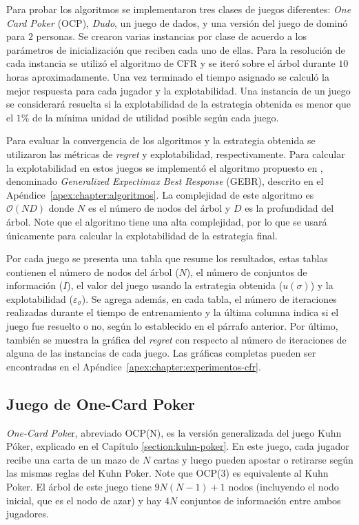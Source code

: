 Para probar los algoritmos se implementaron tres clases de juegos diferentes: \textit{One Card Poker} (OCP), \textit{Dudo}, un juego de dados, y una versión del juego de dominó para $2$ personas. Se crearon varias instancias por clase de acuerdo a los parámetros de inicialización que reciben cada uno de ellas. Para la resolución de cada instancia se utilizó el algoritmo de CFR y se iteró sobre el árbol durante $10$ horas aproximadamente. Una vez terminado el tiempo asignado se calculó la mejor respuesta para cada jugador y la explotabilidad. Una instancia de un juego se considerará resuelta si la explotabilidad de la estrategia obtenida es menor que el $1\%$ de la mínima unidad de utilidad posible según cada juego.

Para evaluar la convergencia de los algoritmos y la estrategia obtenida se utilizaron las métricas de \textit{regret} y explotabilidad, respectivamente. Para calcular la explotabilidad en estos juegos se implementó el algoritmo propuesto en \cite{bib:thesis-marc-lanctot}, denominado \textit{Generalized Expectimax Best Response} (GEBR), descrito en el Apéndice~\ref{apex:chapter:algoritmos}. La complejidad de este algoritmo es $\mathcal{O}(ND)$ donde $N$ es el número de nodos del árbol y $D$ es la profundidad del árbol. Note que el algoritmo tiene una alta complejidad, por lo que se usará únicamente para calcular la explotabilidad de la estrategia final.

Por cada juego se presenta una tabla que resume los resultados, estas tablas contienen el número de nodos del árbol ($N$), el número de conjuntos de información ($I$), el valor del juego usando la estrategia obtenida ($u({\sigma})$) y la explotabilidad ($\varepsilon_{\sigma}$). Se agrega además, en cada tabla, el número de iteraciones realizadas durante el tiempo de entrenamiento y la última columna indica si el juego fue resuelto o no, según lo establecido en el párrafo anterior. Por último, también se muestra la gráfica del \textit{regret} con respecto al número de iteraciones de alguna de las instancias de cada juego. Las gráficas completas pueden ser encontradas en el Apéndice~\ref{apex:chapter:experimentos-cfr}.

\subsection*{Juego de One-Card Poker}
\textit{One-Card Poke}r, abreviado OCP(N), es la versión generalizada del juego Kuhn Póker, explicado en el Capítulo \ref{section:kuhn-poker}. En este juego, cada jugador recibe una carta de un mazo de $N$ cartas y luego pueden apostar o retirarse según las mismas reglas del Kuhn Poker. Note que OCP(3) es equivalente al Kuhn Poker. El árbol de este juego tiene $9N(N-1)+1$ nodos (incluyendo el nodo inicial, que es el nodo de azar) y hay $4N$ conjuntos de información entre ambos jugadores. 

